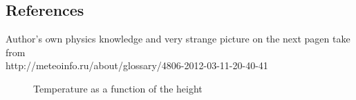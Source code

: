 \documentclass[a4paper,12pt]{article}
\begin{document}
\subsection*{References}
Author's own physics knowledge and very strange picture on the next pagen take from \\
http://meteoinfo.ru/about/glossary/4806-2012-03-11-20-40-41
\newpage
\begin{figure}[h]
	\caption{Temperature as a function of the height}
	\label{ris:athmosphere_vert_struct}
\end{figure}
\end{document}
